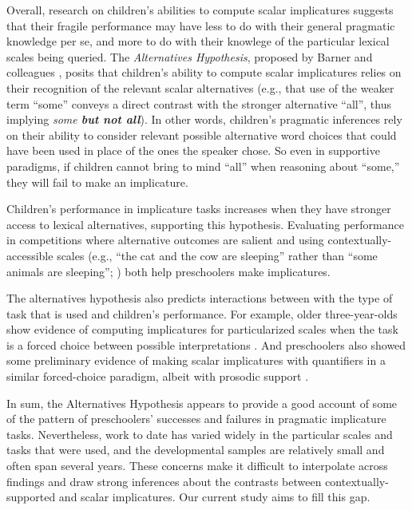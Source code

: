 \documentclass[10pt,letterpaper]{article}
\begin{document}
Overall, research on children's abilities to compute scalar implicatures suggests that their fragile performance may have less to do with their general pragmatic knowledge per se, and more to do with their knowlege of the particular lexical scales being queried. The \emph{Alternatives Hypothesis}, proposed by Barner and colleagues \citep{barner2010, barner2011}, posits that children's ability to compute scalar implicatures relies on their recognition of the relevant scalar alternatives (e.g., that use of the weaker term ``some'' conveys a direct contrast with the stronger alternative ``all'', thus implying \emph{some \textbf{but not all}}).  In other words, children's pragmatic inferences rely on their ability to consider relevant possible alternative word choices that could have been used in place of the ones the speaker chose. So even in supportive paradigms, if children cannot bring to mind ``all'' when reasoning about ``some,'' they will fail to make an implicature.

Children's performance in implicature tasks increases when they have stronger access to lexical alternatives, supporting this hypothesis.  Evaluating performance in competitions where alternative outcomes are salient \citep{papafragou2003} and using contextually-accessible scales (e.g., ``the cat and the cow are sleeping'' rather than ``some animals are sleeping''; \cite{barner2011}) both help preschoolers make implicatures. 

The alternatives hypothesis also predicts interactions between with the type of task that is used and children's performance. For example, older three-year-olds show evidence of computing implicatures for particularized scales when the task is a forced choice between possible interpretations \citep{stiller2014}. And preschoolers also showed some preliminary evidence of making scalar implicatures with quantifiers in a similar forced-choice paradigm, albeit with prosodic support \citep{miller2005}. 

In sum, the Alternatives Hypothesis appears to provide a good account of some of the pattern of preschoolers' successes and failures in pragmatic implicature tasks. Nevertheless, work to date has varied widely in the particular scales and tasks that were used, and the developmental samples are relatively small and often span several years. These concerns make it difficult to interpolate across findings and draw strong inferences about the contrasts between contextually-supported and scalar implicatures. Our current study aims to fill this gap. 
\end{document}
